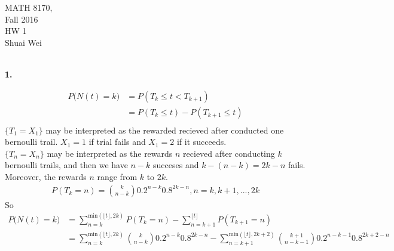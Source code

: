 \documentclass{amsart}
\theoremstyle{plain}
\theoremstyle{definition}
\begin{document}
\noindent MATH 8170,  \\
Fall 2016\\
HW 1\\
Shuai Wei \\
\
\textwidth 6.0in \oddsidemargin 0.0in

\noindent \textbf{1.} 

\begin{align*}
	P\big(N(t) = k\big)  &= P(T_k \leq t < T_{k+1}) \\
						&= P(T_k \leq t) - P(T_{k+1} \leq t) \\
\end{align*}
	$\{T_1 = X_1\}$ may be interpreted as the rewarded recieved after conducted one bernoulli trail. $X_1 = 1$ if trial fails and $X_1 = 2$ if it succeeds.\\
	$\{T_n = X_n\}$ may be interpreted as the rewards $n$ recieved after conducting $k$ bernoulli trails, and then we have $n-k$ succeses and $k-(n-k) = 2k-n$ fails. Moreover, the rewards $n$ range from $k$ to $2k$. \\
	\begin{align*}
		P(T_k = n)  = {k \choose {n-k}} 0.2^{n-k} 0.8^{2k-n}, n = k, k+1, ..., 2k 
	\end{align*}
 So
 	\begin{align*}
		P\big(N(t) = k\big) &= \sum_{n = k}^{\text{min}(\lfloor t\rfloor,2k)} P(T_k = n) - \sum_{n = k+1}^{\lfloor t\rfloor} P(T_{k+1} = n) \\
	   				  	  &= \sum_{n = k}^{\text{min}(\lfloor t\rfloor,2k)} {k \choose {n-k}} 0.2^{n-k} 0.8^{2k-n} - \sum_{n = k+1}^{\text{min}(\lfloor t\rfloor,2k+2)} {k+1 \choose {n-k-1}} 0.2^{n-k-1} 0.8^{2k+2-n} \\
 	\end{align*}
 
\vspace{5mm}
\end{document}
